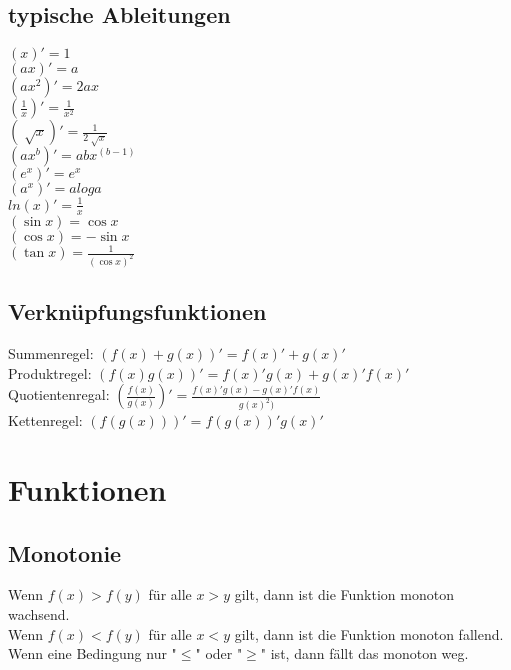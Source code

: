\documentclass[a4paper,landscape, 11pt]{article}
\begin{document}
\begin{multicols}{4}
\begin{small}
    	\subsection{typische Ableitungen}
    	   \begin{multicols}{2}		
    	   		$(x)' = 1$ \\
    			$(ax)' = a$ \\
    			$(ax^2)' = 2ax$ \\
    			$(\frac{1}{x})' = \frac{1}{x^2}$ \\
    			$(\sqrt[]{x})' = \frac{1}{2\sqrt[]{x}}$ \\
    			$(ax^b)' = abx^(b-1)$ \\
    			$(e^x)' = e^x $ \\
    			$(a^x)' = aloga $ \\
    			$ln(x)' = \frac{1}{x}$ \\
    		 	$(\sin x) = \cos x$ \\
    		 	$(\cos x) = -\sin x$ \\
    		 	$(\tan x) = \frac{1}{(\cos x)^2}$ \\ 
    		 	\end{multicols}
      \subsection{Verknüpfungsfunktionen}
      			Summenregel: $(f(x) + g(x))' = f(x)' + g(x)' $ \\ 
      			Produktregel: $(f(x)g(x))' = f(x)'g(x)+g(x)'f(x)' $ \\
      			Quotientenregal: $(\frac{f(x)}{g(x)})' = \frac{f(x)'g(x)-g(x)'f(x)}{g(x)^2)}$ \\
      			Kettenregel: 
      			$(f(g(x)))' = f(g(x))'g(x)'$ \\
      		 
    			
     \section{Funktionen}
             \subsection{Monotonie}
                 Wenn $f(x) > f(y)$ für alle $x > y$ gilt, dann ist die Funktion monoton wachsend. \\
                 Wenn $f(x) < f(y)$ für alle $x < y$ gilt, dann ist die Funktion monoton fallend. \\
                 Wenn eine Bedingung nur "$\le$" oder "$\ge$" ist, dann fällt das monoton weg.
                 

\end{small}
\end{multicols}
\end{document}
